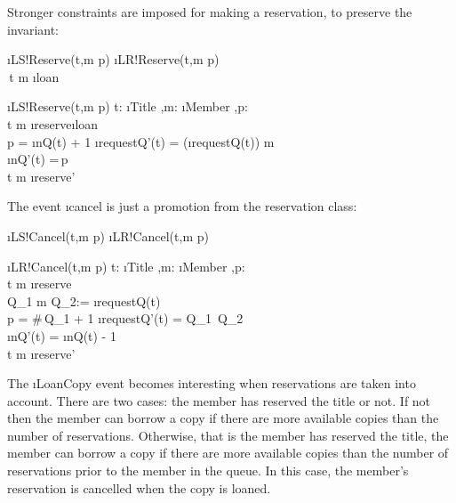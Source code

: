 \documentclass[12pt,a4paper]{article}
\begin{document}
\bigskip\noindent  Stronger constraints are imposed for making a
reservation, to preserve the invariant:

\begin{showspecs}
	\begin{spec}{\i{LS!Reserve(t,m \to p)}}
		\i{LR!Reserve(t,m \to p)}\\[0.25ex]
		\,t \mapsto m \notin \i{loan}
	\end{spec}
\showbeside
	\begin{spec}[\equiv]{\i{LS!Reserve(t,m \to p)}}
		t: \i{Title} \sep m: \i{Member} \sep p: \\
		t \mapsto m \notin \i{reserve}\cup\i{loan}\\
		p = \i{nQ}(t) + 1
	\post	\i{requestQ'}(t) = (\i{requestQ}(t)) \langle m \rangle\\
		\i{nQ'}(t) =\,p\\
		t \mapsto m \in \i{reserve'}
	\end{spec}
\end{showspecs}

\bigskip\noindent The event \i{cancel} is just a promotion from the reservation class:
\begin{showspecs}
	\begin{spec}{\i{LS!Cancel(t,m \to p)}}
		\i{LR!Cancel(t,m \to p)}
	\end{spec}
\showbeside
	\begin{spec}{\i{LR!Cancel(t,m \to p)}}
		t: \i{Title} \sep m: \i{Member} \sep p: \\
		t \mapsto m \in \i{reserve} \\
		Q_1 \langle m \rangle Q_2:= \i{requestQ}(t)\\
        p = \#\,Q_1 + 1
	\post	\i{requestQ'}(t) =\; Q_1 \langle\rangle\,Q_2\\
		\i{nQ'}(t) = \i{nQ}(t) - 1\\
		t \mapsto m \notin \i{reserve'}
	\end{spec}
\end{showspecs}

\bigskip\noindent  The \i{LoanCopy} event becomes interesting when reservations are taken into account.
There are two cases: the member has reserved the title or not.
If not then the member can borrow a copy if there are more available copies than the number of reservations.
Otherwise, that is the member has reserved the title, the member can borrow a copy if
there are more available copies than the number of reservations prior to the member in the queue.
In this case, the member's reservation is cancelled when the copy is loaned.
\end{document}

